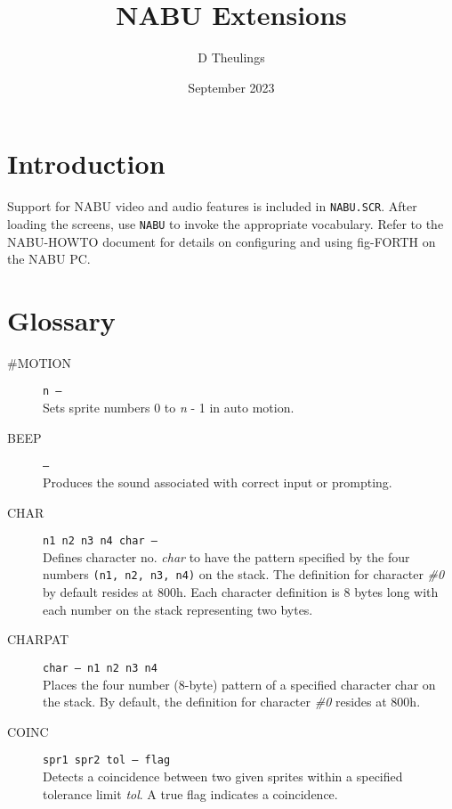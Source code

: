 \documentclass{article}
\title{NABU Extensions}
\author{D Theulings}
\date{September 2023}
\begin{document}
	\maketitle
	\begin{multicols}{2}[]
		\setlength{\parskip}{.5em}
		\setlength\parindent{0pt}

		\section{Introduction}
		Support for NABU video and audio features\footnotemark{} is included
		in \verb|NABU.SCR|. After loading the screens, use \verb|NABU| to invoke
		the appropriate vocabulary. Refer to the NABU-HOWTO document for details 
		on configuring and using fig-FORTH on the NABU PC.

		\section{Glossary}
		\begin{description}
			\item[\#MOTION]\texttt{n --- }\\
				Sets sprite numbers 0 to \textit{n} - 1 in auto motion.

			\item[BEEP]\texttt{--- }\\
				Produces the sound associated with correct input or prompting.

			\item[CHAR]\texttt{n1 n2 n3 n4 char --- }\\
				Defines character no. \textit{char} to have the pattern specified by
				the four numbers \verb|(n1, n2, n3, n4)| on the stack. The definition
				for character \textit{\#0} by default resides at 800h. Each character
				definition is 8 bytes long with each number on the stack representing
				two bytes.

			\item[CHARPAT]\texttt{char --- n1 n2 n3 n4 }\\
				Places the four number (8-byte) pattern of a specified character char
				on the stack. By default, the definition for character \textit{\#0}
				resides at 800h.

			\item[COINC]\texttt{spr1 spr2 tol --- flag }\\
				Detects a coincidence between two given sprites within a specified
				tolerance limit \textit{tol}. A true flag indicates a coincidence.


\end{description}
\end{multicols}
\end{document}
